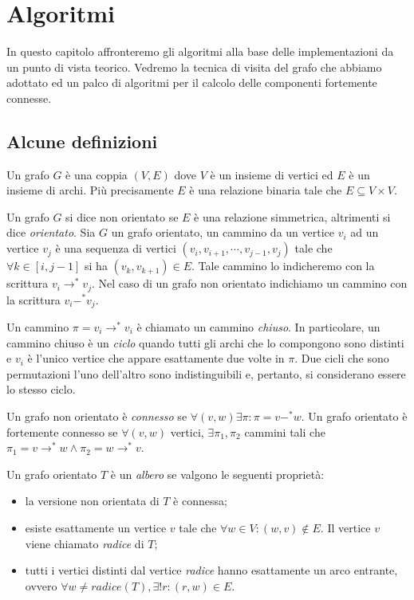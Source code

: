 \chapter{Algoritmi}
\label{chapter:theoretical-background}
In questo capitolo affronteremo gli algoritmi alla base delle
implementazioni da un punto di vista teorico. Vedremo la tecnica di
visita del grafo che abbiamo adottato ed un palco di algoritmi per il
calcolo delle componenti fortemente connesse.

\section{Alcune definizioni}
\label{subsection:some-definitions}
Un grafo $G$ \`e una coppia $(V, E)$ dove $V$ \`e un insieme di
vertici ed $E$ \`e un insieme di archi. Pi\`u precisamente $E$ \`e una
relazione binaria tale che $E \subseteq V \times V$.

Un grafo $G$ si dice non orientato se $E$ \`e una relazione
simmetrica, altrimenti si dice \emph{orientato}. Sia $G$ un grafo
orientato, un cammino da un vertice $v_{i}$ ad un vertice $v_{j}$ \`e
una sequenza di vertici $(v_{i}, v_{i+1}, \cdots, v_{j-1}, v_{j})$
tale che $\forall k \in [i, j-1]$ si ha $(v_{k},v_{k+1}) \in E$. Tale
cammino lo indicheremo con la scrittura $v_{i} \rightarrow^{*}
v_{j}$. Nel caso di un grafo non orientato indichiamo un cammino con
la scrittura $v_{i} -^{*} v_{j}$.

Un cammino $\pi = v_{i} \rightarrow^{*} v_{i}$ \`e chiamato un cammino
\emph{chiuso}. In particolare, un cammino chiuso \`e un \emph{ciclo}
quando tutti gli archi che lo compongono sono distinti e $v_{i}$ \`e
l'unico vertice che appare esattamente due volte in $\pi$. Due cicli
che sono permutazioni l'uno dell'altro sono indistinguibili e,
pertanto, si considerano essere lo stesso ciclo.

Un grafo non orientato \`e \emph{connesso} se $\forall (v, w) \exists
\pi: \pi = v -^{*} w$. Un grafo orientato \`e fortemente connesso se
$\forall (v, w)$ vertici, $\exists \pi_{1}, \pi_{2}$ cammini tali che
$\pi_{1} = v \rightarrow^{*} w \wedge \pi_{2} = w \rightarrow^{*} v$.

Un grafo orientato $T$ \`e un \emph{albero} se valgono le seguenti
propriet\`a:
\begin{itemize}
\item la versione non orientata di $T$ \`e connessa;
\item esiste esattamente un vertice $v$ tale che $\forall w \in V: (w,
  v) \not \in E$. Il vertice $v$ viene chiamato \emph{radice} di $T$;
\item tutti i vertici distinti dal vertice \emph{radice} hanno
  esattamente un arco entrante, ovvero $\forall w \not = radice(T),
  \exists!r: (r, w) \in E$.
\end{itemize}

